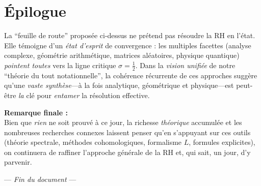 \documentclass[11pt]{article}
\begin{document}
\section*{Épilogue}

La “feuille de route” proposée ci-dessus ne prétend pas résoudre la RH en l’état. Elle témoigne d’un \emph{état d’esprit} de convergence : les multiples facettes (analyse complexe, géométrie arithmétique, matrices aléatoires, physique quantique) \emph{pointent toutes} vers la ligne critique \(\sigma = \tfrac12\). Dans la \emph{vision unifiée} de notre “théorie du tout notationnelle”, la cohérence récurrente de ces approches suggère qu’une \emph{vaste synthèse}---à la fois analytique, géométrique et physique---est peut-être \emph{la} clé pour \emph{entamer} la résolution effective. 

\bigskip
\noindent
\textbf{Remarque finale :} \\
Bien que \emph{rien} ne soit prouvé à ce jour, la richesse \emph{théorique} accumulée et les nombreuses recherches connexes laissent penser qu’en s’appuyant sur ces outils (théorie spectrale, méthodes cohomologiques, formalisme $L$, formules explicites), on continuera de raffiner l’approche générale de la RH et, qui sait, un jour, d’y parvenir.

\medskip
\begin{center}
--- \emph{Fin du document} ---
\end{center}
\end{document}
